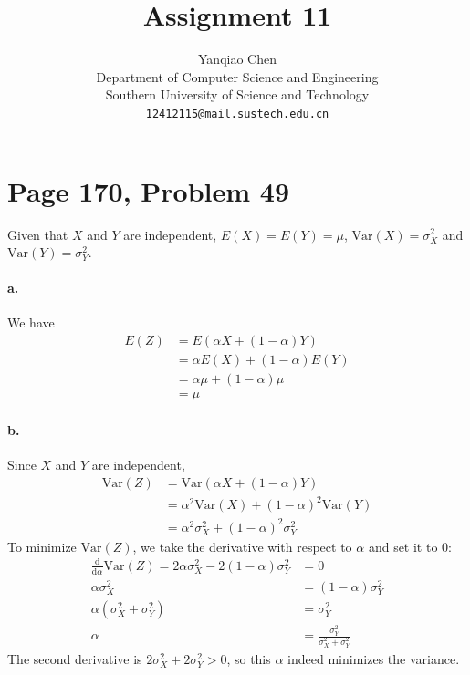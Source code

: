 \documentclass[a4paper, UTF-8]{article}
\theoremstyle{plain}
\begin{document}
\title{\textbf{Assignment 11}}

\author{Yanqiao Chen\\ 
  Department of Computer Science and Engineering\\
  Southern University of Science and Technology\\
  \texttt{12412115@mail.sustech.edu.cn}
  }


\maketitle

\section{Page 170, Problem 49} 

Given that $X$ and $Y$ are independent, $E(X) = E(Y) = \mu$, $\text{Var}(X) = \sigma_X^2$ and $\text{Var}(Y) = \sigma_Y^2$.

\paragraph{a.}
We have
\begin{align*}
E(Z) & = E(\alpha X + (1 - \alpha)Y) \\
& = \alpha E(X) + (1 - \alpha)E(Y) \\
& = \alpha \mu + (1 - \alpha)\mu \\
& = \mu
\end{align*}

\paragraph{b.}
Since $X$ and $Y$ are independent, 
\begin{align*}
\text{Var}(Z) & = \text{Var}(\alpha X + (1 - \alpha)Y) \\
& = \alpha^2 \text{Var}(X) + (1 - \alpha)^2 \text{Var}(Y) \\
& = \alpha^2 \sigma_X^2 + (1 - \alpha)^2 \sigma_Y^2
\end{align*}
To minimize $\text{Var}(Z)$, we take the derivative with respect to $\alpha$ and set it to $0$:
\begin{align*}
\frac{\text{d}}{\text{d}\alpha}\text{Var}(Z) = 2\alpha \sigma_X^2 - 2(1 - \alpha)\sigma_Y^2 & = 0 \\
\alpha \sigma_X^2 & = (1 - \alpha)\sigma_Y^2 \\
\alpha(\sigma_X^2 + \sigma_Y^2) & = \sigma_Y^2 \\
\alpha & = \frac{\sigma_Y^2}{\sigma_X^2 + \sigma_Y^2}
\end{align*}
The second derivative is $2\sigma_X^2 + 2\sigma_Y^2 > 0$, so this $\alpha$ indeed minimizes the variance.
\end{document}
